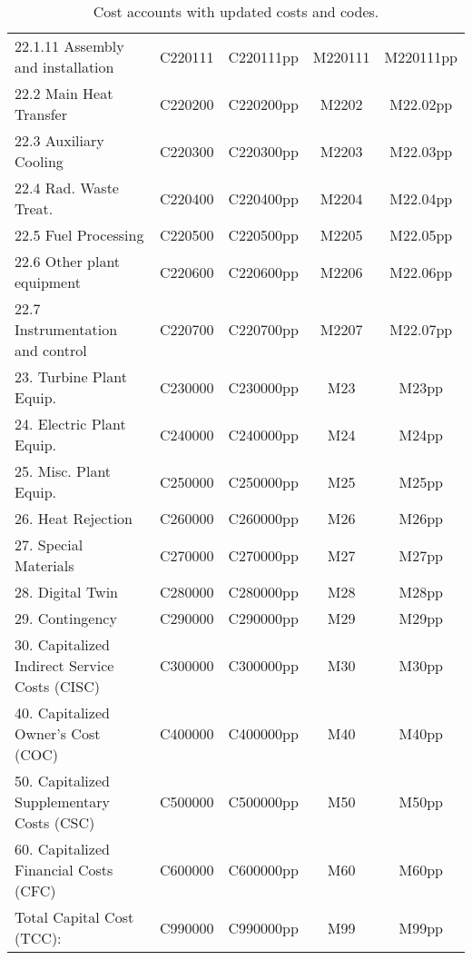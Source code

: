 \begin{table}[h!]
{\begin{tabular}{lcccc}
\hspace{15mm}22.1.11 Assembly and installation & C220111 & C220111pp & M220111 & M220111pp \\
\hspace{10mm}22.2 Main Heat Transfer & C220200 & C220200pp & M2202 & M22.02pp \\
\hspace{10mm}22.3 Auxiliary Cooling & C220300 & C220300pp & M2203 & M22.03pp \\
\hspace{10mm}22.4 Rad. Waste Treat. & C220400 & C220400pp & M2204 & M22.04pp \\
\hspace{10mm}22.5 Fuel Processing & C220500 & C220500pp & M2205 & M22.05pp \\
\hspace{10mm}22.6 Other plant equipment & C220600 & C220600pp & M2206 & M22.06pp \\
\hspace{10mm}22.7 Instrumentation and control & C220700 & C220700pp & M2207 & M22.07pp \\
\hspace{5mm}23. Turbine Plant Equip. & C230000 & C230000pp & M23 & M23pp \\
\hspace{5mm}24. Electric Plant Equip. & C240000 & C240000pp & M24 & M24pp \\
\hspace{5mm}25. Misc. Plant Equip. & C250000 & C250000pp & M25 & M25pp \\
\hspace{5mm}26. Heat Rejection & C260000 & C260000pp & M26 & M26pp \\
\hspace{5mm}27. Special Materials & C270000 & C270000pp & M27 & M27pp \\
\hspace{5mm}28. Digital Twin & C280000 & C280000pp & M28 & M28pp \\
\hspace{5mm}29. Contingency & C290000 & C290000pp & M29 & M29pp \\
30. Capitalized Indirect Service Costs (CISC) & C300000 & C300000pp & M30 & M30pp \\
40. Capitalized Owner’s Cost (COC) & C400000 & C400000pp & M40 & M40pp \\
50. Capitalized Supplementary Costs (CSC) & C500000 & C500000pp & M50 & M50pp \\
60. Capitalized Financial Costs (CFC) & C600000 & C600000pp & M60 & M60pp \\
\hline
Total Capital Cost (TCC): & C990000 & C990000pp & M99 & M99pp \\
\hline
\end{tabular}
}
\caption{Cost accounts with updated costs and codes. }
\label{tab:costsupdatedcodes}
\end{table}



